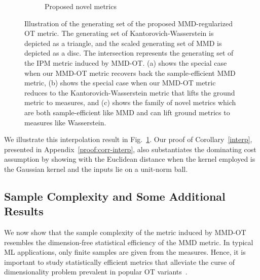 \begin{figure}[t]
\begin{subfigure}{.3\textwidth}
    \caption{Proposed novel metrics}
\end{subfigure}
\caption[Illustration of the generating set of the proposed MMD-OT metric.]{Illustration of the generating set of the proposed MMD-regularized OT metric. The generating set of Kantorovich-Wasserstein is depicted as a triangle, and the scaled generating set of MMD is depicted as a disc. The intersection represents the generating set of the IPM metric induced by MMD-OT. (a) shows the special case when our MMD-OT metric recovers back the sample-efficient MMD metric, (b) shows the special case when our MMD-OT metric reduces to the Kantorovich-Wasserstein metric that lifts the ground metric to measures, and (c) shows the family of novel metrics which are both sample-efficient like MMD and can lift ground metrics to measures like Wasserstein.}\label{fig:metric}
\end{figure}


We illustrate this interpolation result in Fig.~\ref{fig:metric}. Our proof of Corollary~\ref{interp}, presented in Appendix~\ref{proof:corr-interp}, also substantiates the dominating cost assumption by showing with the Euclidean distance when the kernel employed is the Gaussian kernel and the inputs lie on a unit-norm ball.

\subsection{Sample Complexity and Some Additional Results}\label{uot:sampc}
 We now show that the sample complexity of the metric induced by MMD-OT resembles the dimension-free statistical efficiency of the MMD metric. In typical ML applications, only finite samples are given from the measures. Hence, it is important to study statistically efficient metrics that alleviate the curse of dimensionality problem prevalent in popular  OT variants~\citep{nilesweed2019estimation}.

